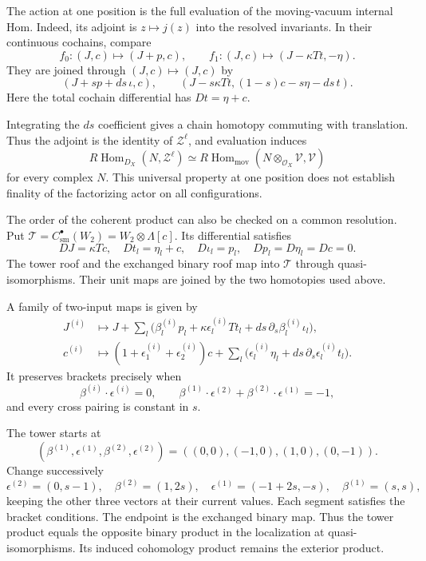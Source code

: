 The action at one position is the full evaluation of the
moving-vacuum internal Hom. Indeed, its adjoint is
$z\mapsto j(z)$ into the resolved invariants.
In their continuous cochains, compare
\[
 f_0:(J,c)\mapsto(J+p,c),\qquad
 f_1:(J,c)\mapsto(J-\kappa Tt,-\eta).
\]
They are joined through $(J,c)\mapsto(J,c)$ by
\[
 (J+sp+ds\,\iota,c),\qquad
 (J-s\kappa Tt,(1-s)c-s\eta-ds\,t).
\]
Here the total cochain differential has $Dt=\eta+c$.

Integrating the $ds$ coefficient gives a chain homotopy
commuting with translation. Thus the adjoint is the identity
of $\mathcal Z^\ell$, and evaluation induces
\[
 R\operatorname{Hom}_{D_X}(N,\mathcal Z^\ell)
 \simeq
 R\operatorname{Hom}_{\mathrm{mov}}
 (N\otimes_{\mathcal O_X}\mathcal V,\mathcal V)
\]
for every complex $N$. This universal property at one
position does not establish finality of the factorizing actor
on all configurations.

The order of the coherent product can also be checked on a
common resolution. Put
$\mathcal T=C^\bullet_{\mathrm{sm}}(W_2)=W_2\otimes\Lambda[c]$.
Its differential satisfies
\[
 DJ=\kappa Tc,\quad Dt_l=\eta_l+c,\quad
 D\iota_l=p_l,\quad Dp_l=D\eta_l=Dc=0.
\]
The tower roof and the exchanged binary roof map into
$\mathcal T$ through quasi-isomorphisms. Their unit
maps are joined by the two homotopies used above.

A family of two-input maps is given by
\[
 \begin{split}
 J^{(i)}&\longmapsto
 J+\sum_l\bigl(\beta_l^{(i)}p_l+
 \kappa\epsilon_l^{(i)}Tt_l+
 ds\,\partial_s\beta_l^{(i)}\iota_l\bigr),\\
 c^{(i)}&\longmapsto
 (1+\epsilon_1^{(i)}+\epsilon_2^{(i)})c+
 \sum_l\bigl(\epsilon_l^{(i)}\eta_l+
 ds\,\partial_s\epsilon_l^{(i)}t_l\bigr).
 \end{split}
\]
It preserves brackets precisely when
\[
 \beta^{(i)}\cdot\epsilon^{(i)}=0,\qquad
 \beta^{(1)}\cdot\epsilon^{(2)}
 +\beta^{(2)}\cdot\epsilon^{(1)}=-1,
\]
and every cross pairing is constant in $s$.

The tower starts at
\[
 (\beta^{(1)},\epsilon^{(1)},\beta^{(2)},\epsilon^{(2)})
 =((0,0),(-1,0),(1,0),(0,-1)).
\]
Change successively
\[
 \epsilon^{(2)}=(0,s-1),\quad
 \beta^{(2)}=(1,2s),\quad
 \epsilon^{(1)}=(-1+2s,-s),\quad
 \beta^{(1)}=(s,s),
\]
keeping the other three vectors at their current values.
Each segment satisfies the bracket conditions.
The endpoint is the exchanged binary map.
Thus the tower product equals the opposite binary product
in the localization at quasi-isomorphisms. Its induced
cohomology product remains the exterior product.

